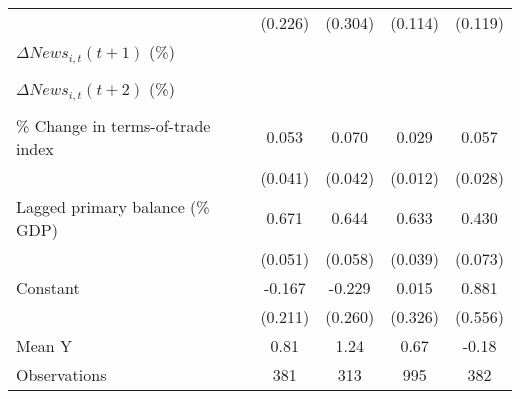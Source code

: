 {\begin{tabular}{l*{4}{c}}
                    &     (0.226)         &     (0.304)         &     (0.114)         &     (0.119)         \\
\addlinespace
$ \Delta News_{i,t}(t+1)$ (\%)&                     &                     &                     &                     \\
                    &                     &                     &                     &                     \\
\addlinespace
$ \Delta News_{i,t}(t+2)$ (\%)&                     &                     &                     &                     \\
                    &                     &                     &                     &                     \\
\addlinespace
\% Change in terms-of-trade index&       0.053         &       0.070         &       0.029\sym{**} &       0.057\sym{*}  \\
                    &     (0.041)         &     (0.042)         &     (0.012)         &     (0.028)         \\
\addlinespace
Lagged primary balance (\% GDP)&       0.671\sym{***}&       0.644\sym{***}&       0.633\sym{***}&       0.430\sym{***}\\
                    &     (0.051)         &     (0.058)         &     (0.039)         &     (0.073)         \\
\addlinespace
Constant            &      -0.167         &      -0.229         &       0.015         &       0.881         \\
                    &     (0.211)         &     (0.260)         &     (0.326)         &     (0.556)         \\
\midrule
Mean Y              &        0.81         &        1.24         &        0.67         &       -0.18         \\
Observations        &         381         &         313         &         995         &         382         \\
\bottomrule
\end{tabular}
}
